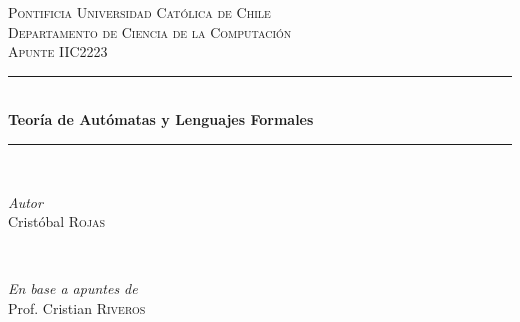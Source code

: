\documentclass[letterpaper]{article}
\begin{document}

\begin{titlepage} %
    \newcommand{\HRule}{\rule{\linewidth}{0.5mm}} %

    \center %


    \textsc{\LARGE Pontificia Universidad Católica de Chile}\\[1.5cm] %

    \textsc{\Large Departamento de Ciencia de la Computación}\\[0.5cm] %

    \textsc{\large Apunte IIC2223}\\[0.5cm] %


    \HRule\\[0.5cm]

    {\huge\bfseries Teoría de Autómatas y Lenguajes Formales}\\[0.4cm] %

    \HRule\\[1.5cm]


    \begin{minipage}{0.4\textwidth}
        \begin{flushleft}
            \large
            \textit{Autor}\\
            Cristóbal \textsc{Rojas} %
        \end{flushleft}
    \end{minipage}
    ~
    \begin{minipage}{0.4\textwidth}
        \begin{flushright}
            \large
            \textit{En base a apuntes de}\\
            Prof. Cristian \textsc{Riveros} %
        \end{flushright}
    \end{minipage}


\end{titlepage}
\end{document}
